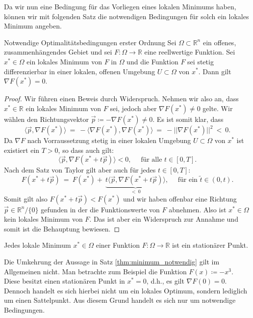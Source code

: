 Da wir nun eine Bedingung für das Vorliegen eines lokalen Minimums haben, können wir mit folgenden Satz die notwendigen Bedingungen für solch ein lokales Minimum angeben.
\begin{theorem}{Notwendige Optimalitätsbedingungen erster Ordnung}{}
\label{thm:minimum_notwendig}
Sei $\Omega \subset \mathbb{R}^n$ ein offenes, zusammenhängendes Gebiet und sei $F \colon \Omega \rightarrow \mathbb{R}$ eine reellwertige Funktion. 
Sei $x^*\in \Omega$ ein lokales Minimum von $F$ in $\Omega$ und die Funktion $F$ sei stetig differenzierbar in einer lokalen, offenen Umgebung $U \subset \Omega$ von $x^*$. 
Dann gilt $\nabla F(x^*) = 0$.
\end{theorem}
\begin{proof}
Wir führen einen Beweis durch Widerspruch. 
Nehmen wir also an, dass $x^* \in \mathbb{R}$ ein lokales Minimum von $F$ sei, jedoch aber $\nabla F(x^*) \neq 0$ gelte.
Wir wählen den Richtungsvektor $\vec{p} \coloneqq -\nabla F(x^*) \neq 0$. 
Es ist somit klar, dass 
\begin{equation*}
\langle \vec{p}, \nabla F(x^*) \rangle \ = \ - \langle \nabla F(x^*), \nabla F(x^*) \rangle \ = \ - ||\nabla F(x^*)||^2 \ < \ 0.
\end{equation*}
Da $\nabla F$ nach Vorraussetzung stetig in einer lokalen Umgebung $U \subset \Omega$ von $x^*$ ist existiert ein $T > 0$, so dass auch gilt:
\begin{equation*}
\langle \vec{p}, \nabla F(x^* + t\vec{p}) \rangle < 0, \quad \text{ für alle } t\in [0,T].
\end{equation*}
Nach dem Satz von Taylor gilt aber auch für jedes $t \in [0,T]$:
\begin{equation*}
F(x^* + t\vec{p}) \ = \ F(x^*) +~\underbrace{t\langle \vec{p}, \nabla F(x^* + t\vec{p}) \rangle}_{<~0}, \quad \text{ für ein } \tilde{t} \in (0,t).
\end{equation*}
Somit gilt also $F(x^* + t\vec{p}) < F(x^*)$ und wir haben offenbar eine Richtung $\vec{p} \in \mathbb{R}^n / \lbrace 0\rbrace$ gefunden in der die Funktionswerte von $F$ abnehmen. 
Also ist $x^* \in \Omega$ kein lokales Minimum von $F$. 
Das ist aber ein Widerspruch zur Annahme und somit ist die Behauptung bewiesen.
\end{proof}
\begin{corollary}{}{}
Jedes lokale Minimum $x^* \in \Omega$ einer Funktion $F \colon \Omega \rightarrow \mathbb{R}$ ist ein stationärer Punkt.
\end{corollary}
\begin{remark}{}{}
Die Umkehrung der Aussage in Satz \ref{thm:minimum_notwendig} gilt im Allgemeinen nicht. 
Man betrachte zum Beispiel die Funktion $F(x) \coloneqq -x^3$. 
Diese besitzt einen stationären Punkt in $x^* = 0$, d.h., es gilt $\nabla F(0) = 0$. 
Dennoch handelt es sich hierbei nicht um ein lokales Optimum, sondern lediglich um einen Sattelpunkt. 
Aus diesem Grund handelt es sich nur um notwendige Bedingungen.
\end{remark}
